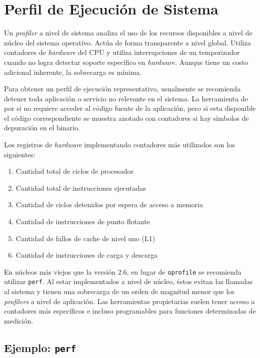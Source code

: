\documentclass[a4paper]{report}
\begin{document}
\section{Perfil de Ejecución de Sistema}

Un {\it profiler} a nivel de sistema analiza el uso de los recursos disponibles a nivel de núcleo del
sistema operativo. Actúa de forma transparente a nivel global. Utiliza
contadores de {\it hardware} del CPU y utiliza interrupciones de un temporizador
cuando no logra detectar soporte específico en {\it hardware}. Aunque tiene un costo adicional inherente, la sobrecarga es mínima.

\bigskip

Para obtener un perfil de ejecución representativo, usualmente se recomienda detener toda aplicación o servicio no relevante en el sistema. La herramienta de por si no requiere acceder al código fuente de la aplicación, pero si esta disponible el código correspondiente se muestra anotado con contadores si hay símbolos de depuración en el binario.

\bigskip

Los registros de {\it hardware} implementando contadores más utilizados son los
siguientes:

\begin{enumerate}
\item Cantidad total de ciclos de procesador
\item Cantidad total de instrucciones ejecutadas
\item Cantidad de ciclos detenidos por espera de acceso a memoria
\item Cantidad de instrucciones de punto flotante
\item Cantidad de fallos de cache de nivel uno (L1)
\item Cantidad de instrucciones de carga y descarga
\end{enumerate}

En núcleos más viejos que la versión 2.6, en lugar de {\tt oprofile} se recomienda utilizar {\tt perf}. Al estar implementados a nivel de núcleo, éstos evitan las llamadas al sistema y tienen una sobrecarga de un orden de magnitud menor que los {\it profilers} a nivel de aplicación. Las herramientas propietarias suelen tener acceso a contadores más específicos e
incluso programables para funciones determinadas de medición.

\subsection{Ejemplo: {\tt perf}}
\end{document}

